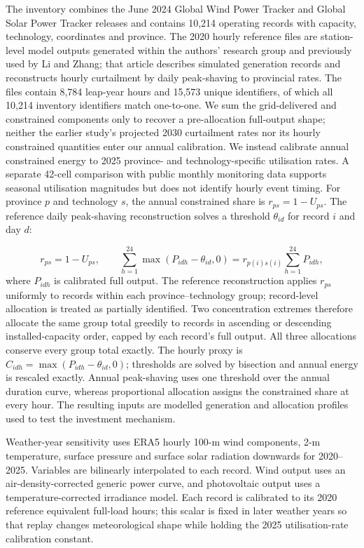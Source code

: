 \documentclass[lineno,pdflatex,sn-nature]{sn-jnl}
\begin{document}
The inventory combines the June 2024 Global Wind Power Tracker and Global Solar Power Tracker releases and contains 10,214 operating records with capacity, technology, coordinates and province\cite{gem2024}. The 2020 hourly reference files are station-level model outputs generated within the authors' research group and previously used by Li and Zhang\cite{li2026}; that article describes simulated generation records and reconstructs hourly curtailment by daily peak-shaving to provincial rates. The files contain 8,784 leap-year hours and 15,573 unique identifiers, of which all 10,214 inventory identifiers match one-to-one. We sum the grid-delivered and constrained components only to recover a pre-allocation full-output shape; neither the earlier study's projected 2030 curtailment rates nor its hourly constrained quantities enter our annual calibration. We instead calibrate annual constrained energy to 2025 province- and technology-specific utilisation rates\cite{renewable2025}. A separate 42-cell comparison with public monthly monitoring data supports seasonal utilisation magnitudes but does not identify hourly event timing\cite{renewablemonthly}. For province $p$ and technology $s$, the annual constrained share is $r_{ps}=1-U_{ps}$. The reference daily peak-shaving reconstruction solves a threshold $\theta_{id}$ for record $i$ and day $d$:

\begin{equation}
r_{ps}=1-U_{ps}, \qquad
\sum_{h=1}^{24}\max\!\left(P_{idh}-\theta_{id},0\right)
=r_{p(i)s(i)}\sum_{h=1}^{24}P_{idh},
\label{eq:curtailment}
\end{equation}
where $P_{idh}$ is calibrated full output. The reference reconstruction applies $r_{ps}$ uniformly to records within each province--technology group; record-level allocation is treated as partially identified. Two concentration extremes therefore allocate the same group total greedily to records in ascending or descending installed-capacity order, capped by each record's full output. All three allocations conserve every group total exactly. The hourly proxy is $C_{idh}=\max(P_{idh}-\theta_{id},0)$; thresholds are solved by bisection and annual energy is rescaled exactly. Annual peak-shaving uses one threshold over the annual duration curve, whereas proportional allocation assigns the constrained share at every hour. The resulting inputs are modelled generation and allocation profiles used to test the investment mechanism.

Weather-year sensitivity uses ERA5 hourly 100-m wind components, 2-m temperature, surface pressure and surface solar radiation downwards for 2020--2025\cite{hersbach2020,era5data}. Variables are bilinearly interpolated to each record. Wind output uses an air-density-corrected generic power curve, and photovoltaic output uses a temperature-corrected irradiance model. Each record is calibrated to its 2020 reference equivalent full-load hours; this scalar is fixed in later weather years so that replay changes meteorological shape while holding the 2025 utilisation-rate calibration constant.
\end{document}
